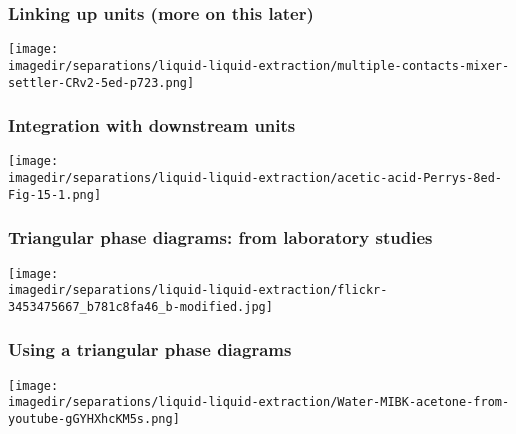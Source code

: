 \begin{frame}\frametitle{Linking up units (more on this later)}
	\begin{center}
		\texttt{[image: \\imagedir/separations/liquid-liquid-extraction/multiple-contacts-mixer-settler-CRv2-5ed-p723.png]}
	\end{center}
\end{frame}

\begin{frame}\frametitle{Integration with downstream units}
	\begin{center}
		\texttt{[image: \\imagedir/separations/liquid-liquid-extraction/acetic-acid-Perrys-8ed-Fig-15-1.png]}
	\end{center}
	\vspace{-10pt}
\end{frame}

\begin{frame}\frametitle{Triangular phase diagrams: from laboratory studies}
	\begin{center}
		\texttt{[image: \\imagedir/separations/liquid-liquid-extraction/flickr-3453475667\_b781c8fa46\_b-modified.jpg]}
	\end{center}
	\vspace{-12pt}
\end{frame}

\begin{frame}\frametitle{Using a triangular phase diagrams}
	\begin{center}
		\texttt{[image: \\imagedir/separations/liquid-liquid-extraction/Water-MIBK-acetone-from-youtube-gGYHXhcKM5s.png]}
	\end{center}
	\vspace{-12pt}
\end{frame}

